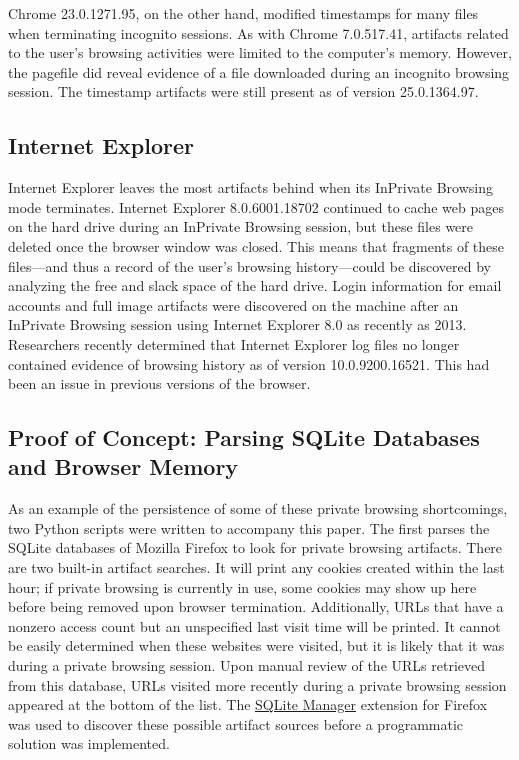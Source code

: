 \documentclass[pdftex,letterpaper,titlepage,12pt]{article}
\begin{document}
    Chrome 23.0.1271.95, on the other hand, modified timestamps for many files
    when terminating incognito sessions. As with Chrome 7.0.517.41, artifacts 
    related to the user's browsing activities were limited to the computer's 
    memory. However, the pagefile did reveal evidence of a file downloaded
    during an incognito browsing session.\cite{ohana13} The timestamp artifacts
    were still present as of version 25.0.1364.97.\cite{satvat13}
    
    \subsection{Internet Explorer}
    Internet Explorer leaves the most artifacts behind when its InPrivate
    Browsing mode terminates.\cite{ohana13} Internet Explorer 8.0.6001.18702
    continued to cache web pages on the hard drive during an InPrivate
    Browsing session, but these files were deleted once the browser window was
    closed. This means that fragments of these files---and thus a record of the
    user's browsing history---could be discovered by analyzing the free and
    slack space of the hard drive.\cite{said11} Login information for email
    accounts and full image artifacts were discovered on the machine after an 
    InPrivate Browsing session using Internet Explorer 8.0 as recently as 2013.
    \cite{ohana13} Researchers recently determined that Internet Explorer log 
    files no longer contained evidence of browsing history as of version 
    10.0.9200.16521. This had been an issue in previous versions of the 
    browser.\cite{satvat13}    
	
	\subsection{Proof of Concept: Parsing SQLite Databases and Browser Memory}
	As an example of the persistence of some of these private browsing 
	shortcomings, two Python scripts were written to accompany this paper.
	The first parses the SQLite databases of Mozilla Firefox to look for 
	private browsing artifacts. There are two built-in artifact searches. It 
	will print any cookies created within the last hour; if private browsing is
	currently in use, some cookies may show up here before being removed upon
	browser termination. Additionally, URLs that have a nonzero access count
	but an unspecified last visit time will be printed. It cannot be easily
	determined when these websites were visited, but it is likely that it was
	during a private browsing session. Upon manual review of the URLs retrieved 
	from this database, URLs visited more recently during a private browsing 
	session appeared at the bottom of the list. The 
	\href{https://addons.mozilla.org/en-US/firefox/addon/sqlite-manager}
	{SQLite Manager} extension for Firefox was used to discover these possible
	artifact sources before a programmatic solution was implemented.
	
\end{document}
